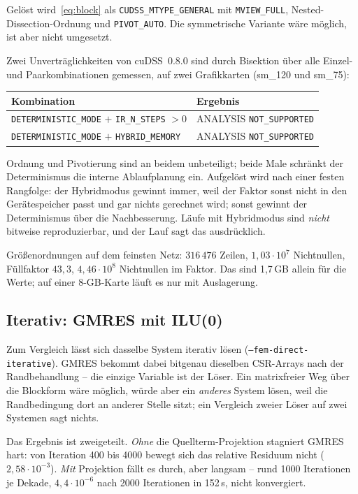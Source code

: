 \documentclass[11pt,a4paper]{article}
\begin{document}
Gelöst wird~\eqref{eq:block} als \texttt{CUDSS\_MTYPE\_GENERAL} mit
\texttt{MVIEW\_FULL}, Nested-Dissection-Ordnung und \texttt{PIVOT\_AUTO}. Die
symmetrische Variante wäre möglich, ist aber nicht umgesetzt.

Zwei Unverträglichkeiten von cuDSS~0.8.0 sind durch Bisektion über alle
Einzel- und Paarkombinationen gemessen, auf zwei Grafikkarten (sm\_120 und
sm\_75):
\begin{center}
\begin{tabular}{ll}
\toprule
Kombination & Ergebnis \\
\midrule
\texttt{DETERMINISTIC\_MODE} $+$ \texttt{IR\_N\_STEPS} $>0$ & ANALYSIS \texttt{NOT\_SUPPORTED} \\
\texttt{DETERMINISTIC\_MODE} $+$ \texttt{HYBRID\_MEMORY}    & ANALYSIS \texttt{NOT\_SUPPORTED} \\
\bottomrule
\end{tabular}
\end{center}
Ordnung und Pivotierung sind an beidem unbeteiligt; beide Male schränkt der
Determinismus die interne Ablaufplanung ein. Aufgelöst wird nach einer festen
Rangfolge: der Hybridmodus gewinnt immer, weil der Faktor sonst nicht in den
Gerätespeicher passt und gar nichts gerechnet wird; sonst gewinnt der
Determinismus über die Nachbesserung. Läufe mit Hybridmodus sind \emph{nicht}
bitweise reproduzierbar, und der Lauf sagt das ausdrücklich.

Größenordnungen auf dem feinsten Netz: $316\,476$ Zeilen, $1{,}03\cdot10^{7}$
Nichtnullen, Füllfaktor $43{,}3$, $4{,}46\cdot10^{8}$ Nichtnullen im Faktor.
Das sind 1,7\,GB allein für die Werte; auf einer 8-GB-Karte läuft es nur
mit Auslagerung.

\subsection{Iterativ: GMRES mit ILU(0)}
\label{sec:iterativ}

Zum Vergleich lässt sich dasselbe System iterativ lösen
(\texttt{--fem-direct-iterative}). GMRES bekommt dabei bitgenau dieselben
CSR-Arrays nach der Randbehandlung -- die einzige Variable ist der Löser. Ein
matrixfreier Weg über die Blockform wäre möglich, würde aber ein
\emph{anderes} System lösen, weil die Randbedingung dort an anderer Stelle
sitzt; ein Vergleich zweier Löser auf zwei Systemen sagt nichts.

Das Ergebnis ist zweigeteilt. \emph{Ohne} die Quellterm-Projektion stagniert
GMRES hart: von Iteration 400 bis 4000 bewegt sich das relative Residuum nicht
($2{,}58\cdot10^{-3}$). \emph{Mit} Projektion fällt es durch, aber langsam --
rund 1000 Iterationen je Dekade, $4{,}4\cdot10^{-6}$ nach 2000 Iterationen in
152\,s, nicht konvergiert.
\end{document}
